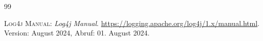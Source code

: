 
\appendix

\begin{thebibliography}{99}
	
	
	\label{bib:LOG4J}
	\textsc{Log4j Manual}: \textit{Log4j Manual}. \url{https://logging.apache.org/log4j/1.x/manual.html}. Version: August 2024, Abruf: 01. August 2024.
		
	

\end{thebibliography}
